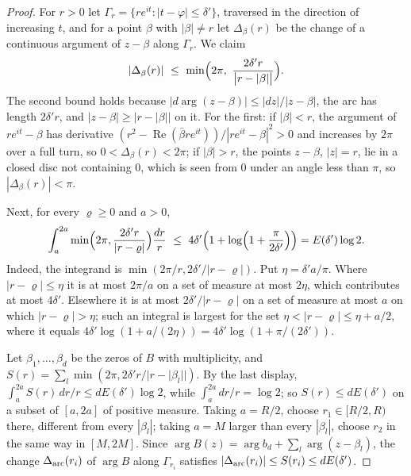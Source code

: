 \documentclass[11pt]{article}
\begin{document}
\begin{proof}
For $r>0$ let $\Gamma_r=\{re^{it}:|t-\varphi|\le\delta'\}$, traversed in the
direction of increasing $t$, and for a point $\beta$ with $|\beta|\ne r$ let
$\Delta_\beta(r)$ be the change of a continuous argument of $z-\beta$ along
$\Gamma_r$.  We claim
\[
  |\Delta_\beta(r)|\ \le\ \min\Bigl(2\pi,\ \frac{2\delta'r}{\bigl|r-|\beta|\bigr|}\Bigr).
\]
The second bound holds because $|d\arg(z-\beta)|\le|dz|/|z-\beta|$, the arc
has length $2\delta'r$, and $|z-\beta|\ge|r-|\beta||$ on it.  For the first:
if $|\beta|<r$, the argument of $re^{it}-\beta$ has derivative
$(r^2-\operatorname{Re}(\bar\beta re^{it}))/|re^{it}-\beta|^2>0$ and increases by
$2\pi$ over a full turn, so $0<\Delta_\beta(r)<2\pi$; if $|\beta|>r$, the
points $z-\beta$, $|z|=r$, lie in a closed disc not containing $0$, which is
seen from $0$ under an angle less than $\pi$, so $|\Delta_\beta(r)|<\pi$.

Next, for every $\varrho\ge0$ and $a>0$,
\[
  \int_a^{2a}\min\Bigl(2\pi,\frac{2\delta'r}{|r-\varrho|}\Bigr)\frac{dr}r
  \ \le\ 4\delta'\Bigl(1+\log\Bigl(1+\frac\pi{2\delta'}\Bigr)\Bigr)
  =E(\delta')\log2 .
\]
Indeed, the integrand is $\min(2\pi/r,2\delta'/|r-\varrho|)$.  Put
$\eta=\delta'a/\pi$.  Where $|r-\varrho|\le\eta$ it is at most $2\pi/a$ on a
set of measure at most $2\eta$, which contributes at most $4\delta'$.  Elsewhere
it is at most $2\delta'/|r-\varrho|$ on a set of measure at most $a$ on which
$|r-\varrho|>\eta$; such an integral is largest for the set
$\eta<|r-\varrho|\le\eta+a/2$, where it equals
$4\delta'\log(1+a/(2\eta))=4\delta'\log(1+\pi/(2\delta'))$.

Let $\beta_1,\ldots,\beta_d$ be the zeros of $B$ with multiplicity, and
$S(r)=\sum_l\min(2\pi,2\delta'r/|r-|\beta_l||)$.  By the last display,
$\int_a^{2a}S(r)\,dr/r\le dE(\delta')\log2$, while
$\int_a^{2a}dr/r=\log2$; so $S(r)\le dE(\delta')$ on a subset of $[a,2a]$ of
positive measure.  Taking $a=R/2$, choose $r_1\in[R/2,R)$ there, different from
every $|\beta_l|$; taking $a=M$ larger than every $|\beta_l|$, choose $r_2$ in
the same way in $[M,2M]$.  Since
$\arg B(z)=\arg b_d+\sum_l\arg(z-\beta_l)$, the change $\Delta_{\rm arc}(r_i)$
of $\arg B$ along $\Gamma_{r_i}$ satisfies
$|\Delta_{\rm arc}(r_i)|\le S(r_i)\le dE(\delta')$.


\end{proof}
\end{document}
